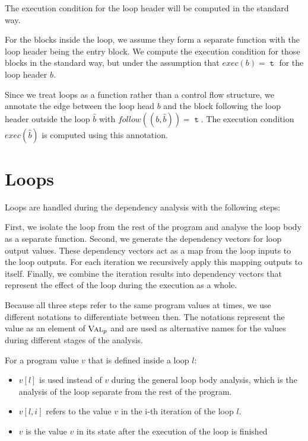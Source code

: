 The execution condition for the loop header will be computed in the standard way.

For the blocks inside the loop, we assume they form a separate function with the loop header being the entry block. We compute the execution condition for those blocks in the standard way, but under the assumption that $exec(b) = \mttt$ for the loop header $b$.

Since we treat loops as a function rather than a control flow structure, we annotate the edge between the loop head $b$ and the block following the loop header outside the loop $\hat{b}$ with $follow((b, \hat{b})) = \mttt$. The execution condition $exec(\hat{b})$ is computed using this annotation.

\section{Loops}\label{sec:loops}
Loops are handled during the dependency analysis with the following steps:

First, we isolate the loop from the rest of the program and analyse the loop body as a separate function. Second, we generate the dependency vectors for loop output values. These dependency vectors act as a map from the loop inputs to the loop outputs. For each iteration we recursively apply this mapping outputs to itself. Finally, we combine the iteration results into dependency vectors that represent the effect of the loop during the execution as a whole.

Because all three steps refer to the same program values at times, we use different notations to differentiate between then. The notations represent the value as an element of $\textsc{Val}_p$ and are used as alternative names for the values during different stages of the analysis.

For a program value $v$ that is defined inside a loop $l$:
\begin{itemize}
    \setlength\itemsep{0em}
    \item $v[l]$ is used instead of $v$ during the general loop body analysis, which is the analysis of the loop separate from the rest of the program.
    \item $v[l, i]$ refers to the value $v$ in the i-th iteration of the loop $l$.
    \item $v$ is the value $v$ in its state after the execution of the loop is finished
\end{itemize}


